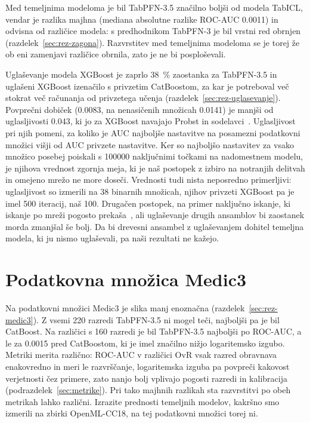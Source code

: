 \documentclass[a4paper,12pt,openright]{book}
\begin{document}
Med temeljnima modeloma je bil TabPFN-3.5 značilno boljši od modela TabICL,
vendar je razlika majhna (mediana absolutne razlike ROC-AUC \num{0.0011}) in
odvisna od različice modela: s predhodnikom TabPFN-3 je bil vrstni red obrnjen
(razdelek~\ref{sec:rez-zagona}). Razvrstitev med temeljnima modeloma se je
torej že ob eni zamenjavi različice obrnila, zato je ne bi posploševali.

Uglaševanje modela XGBoost je zaprlo \SI{38}{\percent} zaostanka za
TabPFN-3.5 in uglašeni XGBoost izenačilo s privzetim CatBoostom, za kar je
potreboval več stokrat več računanja od privzetega učenja
(razdelek~\ref{sec:rez-uglasevanje}). Povprečni dobiček (\num{0.0083}, na
nenasičenih množicah \num{0.0141}) je manjši od uglasljivosti \num{0.043}, ki
jo za XGBoost navajajo Probst in sodelavci~\cite{probst2019tunability}.
Uglasljivost pri njih pomeni, za koliko je AUC najboljše nastavitve na
posamezni podatkovni množici višji od AUC privzete nastavitve. Ker so najboljšo
nastavitev za vsako množico posebej poiskali s \num{100000} naključnimi točkami
na nadomestnem modelu, je njihova vrednost zgornja meja, ki je naš postopek z
izbiro na notranjih delitvah in omejeno mrežo ne more doseči. Vrednosti tudi
nista neposredno primerljivi: uglasljivost so izmerili na 38 binarnih
množicah, njihov privzeti XGBoost pa je imel 500 iteracij, naš 100.
Drugačen postopek,
na primer naključno iskanje, ki iskanje po mreži pogosto
prekaša~\cite{bischl2023hyperparameter}, ali uglaševanje drugih ansamblov bi
zaostanek morda zmanjšal še bolj. Da bi drevesni ansambel z uglaševanjem
dohitel temeljna modela, ki ju nismo uglaševali, pa naši rezultati ne kažejo.

\section{Podatkovna množica Medic3}
\label{sec:disk-medic3}

Na podatkovni množici Medic3 je slika manj enoznačna
(razdelek~\ref{sec:rez-medic3}). Z vsemi 220 razredi TabPFN-3.5 ni mogel teči,
najboljši pa je bil CatBoost. Na različici s 160 razredi je bil TabPFN-3.5
najboljši po ROC-AUC, a le za \num{0.0015} pred CatBoostom, ki je imel značilno
nižjo logaritemsko izgubo. Metriki merita različno: ROC-AUC v različici OvR
vsak razred obravnava enakovredno in meri le razvrščanje, logaritemska izguba
pa povpreči kakovost verjetnosti čez primere, zato nanjo bolj vplivajo pogosti
razredi in kalibracija (podrazdelek~\ref{sec:metrike}). Pri tako majhnih
razlikah sta razvrstitvi po obeh metrikah lahko različni. Izrazite prednosti
temeljnih modelov, kakršno smo izmerili na zbirki OpenML-CC18, na tej
podatkovni množici torej ni.
\end{document}
